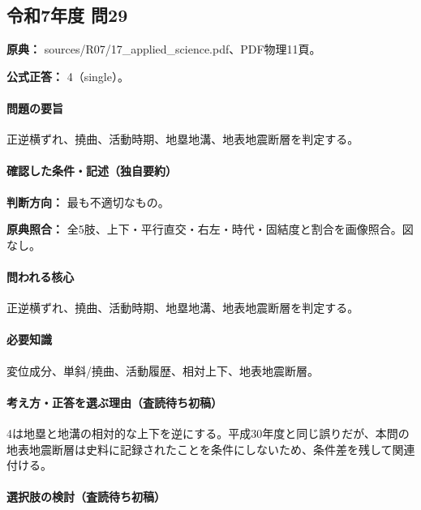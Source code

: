 \subsection{令和7年度 問29}
\label{q:r07-reg-applied-29}

\noindent\textbf{原典：} sources/R07/17\_applied\_science.pdf、PDF物理11頁。

\textbf{公式正答：} 4（single）。

\paragraph{問題の要旨} 正逆横ずれ、撓曲、活動時期、地塁地溝、地表地震断層を判定する。

\paragraph{確認した条件・記述（独自要約）}\mbox{}\par

\noindent\textbf{判断方向：} 最も不適切なもの。\par

\noindent\textbf{原典照合：} 全5肢、上下・平行直交・右左・時代・固結度と割合を画像照合。図なし。\par

\paragraph{問われる核心} 正逆横ずれ、撓曲、活動時期、地塁地溝、地表地震断層を判定する。

\paragraph{必要知識} 変位成分、単斜/撓曲、活動履歴、相対上下、地表地震断層。

\paragraph{考え方・正答を選ぶ理由（査読待ち初稿）} 4は地塁と地溝の相対的な上下を逆にする。平成30年度と同じ誤りだが、本問の地表地震断層は史料に記録されたことを条件にしないため、条件差を残して関連付ける。

\paragraph{選択肢の検討（査読待ち初稿）}\mbox{}\par

